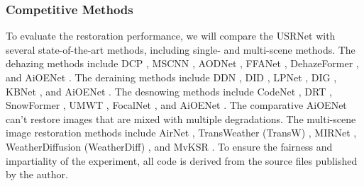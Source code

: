 \documentclass[final,12pt]{elsarticle}
\begin{document}
\subsubsection{Competitive Methods}
    To evaluate the restoration performance, we will compare the USRNet with several state-of-the-art methods, including single- and multi-scene methods. The dehazing methods include DCP \citep{he2010single}, MSCNN \citep{ren2016single}, AODNet \citep{li2017aod}, FFANet \citep{qin2020ffa}, DehazeFormer \citep{song2023vision}, and AiOENet \citep{liu2023aioenet}. The deraining methods include DDN \citep{fu2017removing}, DID \citep{zhang2018density}, LPNet \citep{fu2019lightweight}, DIG \citep{ran2020single}, KBNet \citep{zhang2023kbnet}, and AiOENet \citep{liu2023aioenet}. The desnowing methods include CodeNet \citep{yu2021single}, DRT \citep{liang2022drt}, SnowFormer \citep{chen2022snowformer}, UMWT \citep{kulkarni2023unified}, FocalNet \citep{cui2023focal}, and AiOENet \citep{liu2023aioenet}. The comparative AiOENet can't restore images that are mixed with multiple degradations. The multi-scene image restoration methods include AirNet \citep{li2022all}, TransWeather (TransW) \citep{valanarasu2022transweather}, MIRNet \citep{zamir2022learning}, WeatherDiffusion (WeatherDiff) \citep{ozdenizci2023restoring}, and MvKSR \citep{xu2024mvksr}. To ensure the fairness and impartiality of the experiment, all code is derived from the source files published by the author.
%
\end{document}
